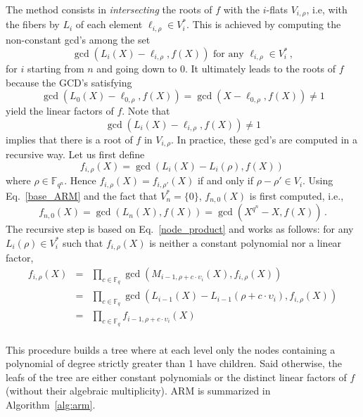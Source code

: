\documentclass{sig-alternate}
\newcommand{\ff}[1]{\mathbb{F}_{#1}}
\newcommand{\qq}{q}
\newcommand{\nn}{n}
\newcommand{\qn}{{\qq^\nn}}
\newcommand{\basef}{\ff{\qq}}
\newcommand{\extf}{\ff{\qn}}
\renewcommand{\paragraph}[1]{\smallskip\noindent{{\bf \rm #1.}}}
\begin{document}
\paragraph{ARM} The method consists in \emph{intersecting} the roots of $f$ with the $i$-flats  $V_{i,\rho}$, i.e, with the fibers by $L_i$ of each element $\ell_{i,\rho} \in V_i^\ast$.
 This is achieved by computing the non-constant gcd's among the set
 \begin{equation}
 \label{base_ARM}
\gcd(L_i(X)-\ell_{i,\rho},f(X))     \mbox{ for any }  \ell_{i,\rho}  \in V_i^\ast\,,
\end{equation}
for $i$ starting from $n$ and going down to 0.
It ultimately leads to the roots of $f$ because the GCD's satisfying
$$\gcd(L_0(X)-\ell_{0,\rho},f(X))=\gcd(X-\ell_{0,\rho},f(X)) \ne 1$$ 
yield the linear factors of $f$. 
Note that 
\begin{equation}
  \label{eq:duality-gcd}
  \gcd(L_i(X)-\ell_{i,\rho},f(X)) \ne 1
\end{equation}
implies that there is a root of $f$ in $V_{i,\rho}$.
In practice, these gcd's are computed in a recursive way. Let us first define
 $$f_{i,\rho}(X)=\gcd(L_i(X)-L_i(\rho),f(X))\,$$
where $\rho \in \extf$. Hence $f_{i,\rho}(X)=f_{i,\rho'}(X)$ if and only if $\rho-\rho' \in V_i$.
Using Eq.~\eqref{base_ARM} and the fact that $V_n^\ast=\{0\}$, $f_{n,0}(X)$ is first computed, i.e.,
 $$f_{n,0}(X)=\gcd(L_n(X),f(X))=\gcd(X^{q^\nn}-X,f(X))\,.$$
The recursive step is based on Eq.~\eqref{node_product} and works as follows: for any $L_i(\rho) \in V_i^\ast$ such that $f_{i,\rho}(X)$ is neither a constant polynomial nor a linear factor,
  $$
  \begin{array}{lll}
  f_{i,\rho}(X)&=&\prod_{c \in \basef} \gcd(M_{i-1,\rho+c \cdot \upsilon_i}(X),f_{i,\rho}(X)) \\
               &=&\prod_{c \in \basef} \gcd(L_{i-1}(X)-L_{i-1}(\rho+c \cdot \upsilon_i),f_{i,\rho}(X)) \\
               &=&\prod_{c \in \basef} f_{i-1,\rho+c \cdot  \upsilon_i}(X)\\
  \end{array}              
  $$ 
 
 This procedure builds a tree where at each level only the nodes containing a polynomial of degree strictly greater than 1 have children. Said otherwise, the leafs of the tree are either constant polynomials or the distinct linear factors of $f$ (without their algebraic multiplicity). ARM is summarized in Algorithm~\ref{alg:arm}.
\end{document}
